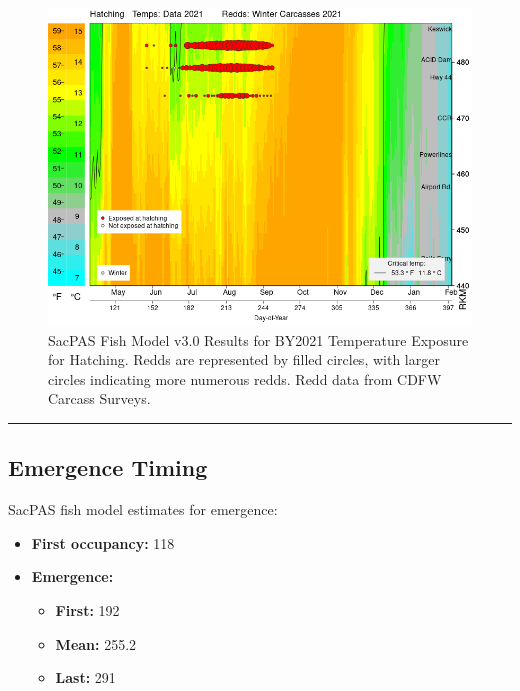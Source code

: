 \documentclass[
]{book}
\providecommand{\tightlist}{%
  \setlength{\itemsep}{0pt}\setlength{\parskip}{0pt}}
\theoremstyle{definition}
\theoremstyle{definition}
\theoremstyle{definition}
\theoremstyle{definition}
\theoremstyle{remark}
\begin{document}
\begin{figure}

{\centering \includegraphics[width=2\linewidth]{figures/fishmodel_2021_hatchplot} 

}

\caption{SacPAS Fish Model v3.0 Results for BY2021 Temperature Exposure for Hatching. Redds are represented by filled circles, with larger circles indicating more numerous redds. Redd data from CDFW Carcass Surveys.}\label{fig:fishmodel-hatching-fig}
\end{figure}

\begin{center}\rule{0.5\linewidth}{0.5pt}\end{center}

\hypertarget{emergence-timing}{%
\subsection{Emergence Timing}\label{emergence-timing}}

SacPAS fish model estimates for emergence:

\begin{itemize}
\tightlist
\item
  \textbf{First occupancy:} 118
\item
  \textbf{Emergence:}

  \begin{itemize}
  \tightlist
  \item
    \textbf{First: } 192
  \item
    \textbf{Mean: } 255.2
  \item
    \textbf{Last: } 291
  \end{itemize}
\end{itemize}
\end{document}
